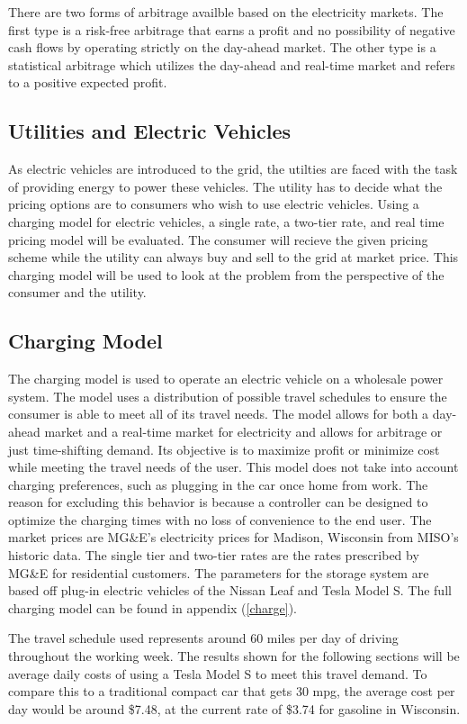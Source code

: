 There are two forms of arbitrage availble based on the electricity markets.  The first type is a risk-free arbitrage that earns a profit and no possibility of negative cash flows by operating strictly on the day-ahead market.  The other type is a statistical arbitrage which utilizes the day-ahead and real-time market and refers to a positive expected profit.    

\subsection{Utilities and Electric Vehicles}
As electric vehicles are introduced to the grid, the utilties are faced with the task of providing energy to power these vehicles.  The utility has to decide what the pricing options are to consumers who wish to use electric vehicles.  Using a charging model for electric vehicles, a single rate, a two-tier rate, and real time pricing model will be evaluated.  The consumer will recieve the given pricing scheme while the utility can always buy and sell to the grid at market price.  This charging model will be used to look at the problem from the perspective of the consumer and the utility.

\subsection{Charging Model}
The charging model is used to operate an electric vehicle on a wholesale power system.  The model uses a distribution of possible travel schedules to ensure the consumer is able to meet all of its travel needs.  The model allows for both a day-ahead market and a real-time market for electricity and allows for arbitrage or just time-shifting demand.  Its objective is to maximize profit or minimize cost while meeting the travel needs of the user.  This model does not take into account charging preferences, such as plugging in the car once home from work.  The reason for excluding this behavior is because a controller can be designed to optimize the charging times with no loss of convenience to the end user.  The market prices are MG\&E's electricity prices for Madison, Wisconsin from MISO's historic data.  The single tier and two-tier rates are the rates prescribed by MG\&E for residential customers.  The parameters for the storage system are based off plug-in electric vehicles of the Nissan Leaf and Tesla Model S.  The full charging model can be found in appendix (\ref{charge}).

The travel schedule used represents around 60 miles per day of driving throughout the working week.  The results shown for the following sections will be average daily costs of using a Tesla Model S to meet this travel demand.  To compare this to a traditional compact car that gets 30 mpg, the average cost per day would be around \$7.48, at the current rate of \$3.74 for gasoline in Wisconsin.


